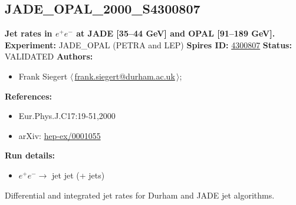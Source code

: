 \subsection[JADE\_OPAL\_2000\_S4300807]{JADE\_OPAL\_2000\_S4300807\,\cite{Pfeifenschneider:1999rz}}
\textbf{Jet rates in $e^+e^-$ at JADE [35--44 GeV] and OPAL [91--189 GeV].}\newline
\textbf{Experiment:} JADE_OPAL (PETRA and LEP) \newline
\textbf{Spires ID:} \href{http://www.slac.stanford.edu/spires/find/hep/www?rawcmd=key+4300807}{4300807}\newline
\textbf{Status:} VALIDATED\newline
\textbf{Authors:}
\begin{itemize}
  \item Frank Siegert $\langle\,$\href{mailto:frank.siegert@durham.ac.uk}{frank.siegert@durham.ac.uk}$\,\rangle$;
\end{itemize}
\textbf{References:}
\begin{itemize}
  \item Eur.Phys.J.C17:19-51,2000
  \item arXiv: \href{http://arxiv.org/abs/hep-ex/0001055}{hep-ex/0001055}
\end{itemize}
\textbf{Run details:}
\begin{itemize}

  \item $e^+ e^- \to$ jet jet (+ jets)\end{itemize}

\noindent Differential and integrated jet rates for Durham and JADE jet algorithms.

\clearpage


\clearpage

